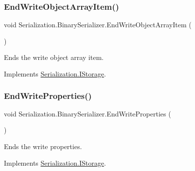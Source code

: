 \subsubsection{\texorpdfstring{End\+Write\+Object\+Array\+Item()}{EndWriteObjectArrayItem()}}
{\footnotesize\ttfamily void Serialization.\+Binary\+Serializer.\+End\+Write\+Object\+Array\+Item (\begin{DoxyParamCaption}{ }\end{DoxyParamCaption})\hspace{0.3cm}{\ttfamily [inline]}}



Ends the write object array item. 



Implements \hyperlink{interface_serialization_1_1_i_storage_a0cde5cf5cf0ba7a6a229213330619a49}{Serialization.\+I\+Storage}.

\mbox{\label{class_serialization_1_1_binary_serializer_af242d8344e351d53f4cb1dca1f0d321c}} 
\subsubsection{\texorpdfstring{End\+Write\+Properties()}{EndWriteProperties()}}
{\footnotesize\ttfamily void Serialization.\+Binary\+Serializer.\+End\+Write\+Properties (\begin{DoxyParamCaption}{ }\end{DoxyParamCaption})\hspace{0.3cm}{\ttfamily [inline]}}



Ends the write properties. 



Implements \hyperlink{interface_serialization_1_1_i_storage_ad922a8b40756c84f00aa6afd75b93735}{Serialization.\+I\+Storage}.

\mbox{\label{class_serialization_1_1_binary_serializer_a481fce2c7372e97a46ab15316c33a395}} 
